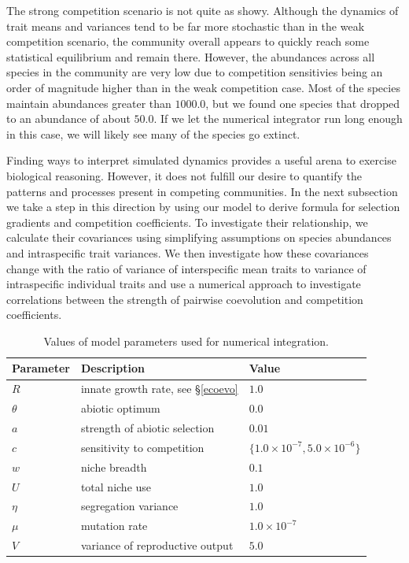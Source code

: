 \documentclass[]{article}
\begin{document}
The strong competition scenario is not quite as showy. Although the
dynamics of trait means and variances tend to be far more stochastic
than in the weak competition scenario, the community overall appears to
quickly reach some statistical equilibrium and remain there. However,
the abundances across all species in the community are very low due to
competition sensitivies being an order of magnitude higher than in the
weak competition case. Most of the species maintain abundances greater
than \(1000.0\), but we found one species that dropped to an abundance
of about \(50.0\). If we let the numerical integrator run long enough in
this case, we will likely see many of the species go extinct.

Finding ways to interpret simulated dynamics provides a useful arena to
exercise biological reasoning. However, it does not fulfill our desire
to quantify the patterns and processes present in competing communities.
In the next subsection we take a step in this direction by using our
model to derive formula for selection gradients and competition
coefficients. To investigate their relationship, we calculate their
covariances using simplifying assumptions on species abundances and
intraspecific trait variances. We then investigate how these covariances
change with the ratio of variance of interspecific mean traits to
variance of intraspecific individual traits and use a numerical approach
to investigate correlations between the strength of pairwise coevolution
and competition coefficients.

\begin{table}
\centering\caption{Values of model parameters used for numerical integration.}\vspace{0.2cm}
\begin{tabular}{l|l|l}
Parameter     & Description & Value                                           \\ \hline
$R$         & innate growth rate, see \S\ref{ecoevo}  & $1.0$      \\
$\theta$    & abiotic optimum & $0.0$                              \\
$a$         & strength of abiotic selection & $0.01$               \\
$c$         & sensitivity to competition & $\{1.0\times10^{-7},5.0\times10^{-6}\}$ \\
$w$         & niche breadth & $0.1$                               \\
$U$         & total niche use & $1.0$                              \\
$\eta$      & segregation variance & $1.0$                         \\
$\mu$       & mutation rate & $1.0\times10^{-7}$                             \\
$V$ & variance of reproductive output & $5.0$
\end{tabular}\label{par_vals}
\end{table}
\end{document}
